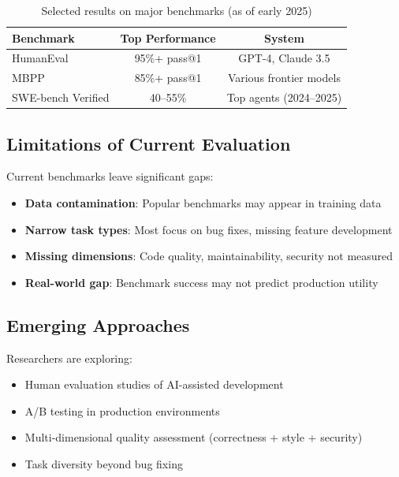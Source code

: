 \begin{table}[h]
\centering
\caption{Selected results on major benchmarks (as of early 2025)}
\label{tab:benchmarks}
\begin{tabular}{lcc}
\toprule
\textbf{Benchmark} & \textbf{Top Performance} & \textbf{System} \\
\midrule
HumanEval & 95\%+ pass@1 & GPT-4, Claude 3.5 \\
MBPP & 85\%+ pass@1 & Various frontier models \\
SWE-bench Verified & 40--55\% & Top agents (2024--2025) \\
\bottomrule
\end{tabular}
\end{table}

\subsection{Limitations of Current Evaluation}

Current benchmarks leave significant gaps:

\begin{itemize}
    \item \textbf{Data contamination}: Popular benchmarks may appear in training data
    \item \textbf{Narrow task types}: Most focus on bug fixes, missing feature development
    \item \textbf{Missing dimensions}: Code quality, maintainability, security not measured
    \item \textbf{Real-world gap}: Benchmark success may not predict production utility
\end{itemize}

\subsection{Emerging Approaches}

Researchers are exploring:
\begin{itemize}
    \item Human evaluation studies of AI-assisted development
    \item A/B testing in production environments
    \item Multi-dimensional quality assessment (correctness + style + security)
    \item Task diversity beyond bug fixing
\end{itemize}
